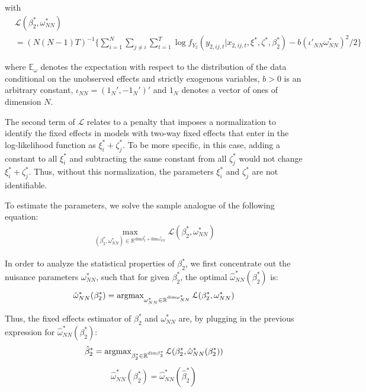 \noindent with 
\begin{align} \label{eq:unconditional}
    &\mathcal{L} (\beta_2^*, \omega_{NN}^*) \\ &= (N(N-1)T)^{-1} \Big\{ \sum_{i=1}^{N}\sum_{j\neq i}\sum_{t=1}^T \log f_{Y_2} ( y_{2,ij,t} \rvert  x_{2,ij,t}, \xi^*, \zeta^*, \beta_2^*) - b(\iota'_{NN} \omega_{NN}^*)^2/2 \Big\} \nonumber
\end{align}

\noindent where $\mathbb{E}_\omega$ denotes the expectation with respect to the distribution of the data conditional on the unobserved effects and strictly exogenous variables, $b>0$ is an arbitrary constant, $\iota_{NN} = (1_N', - 1_N')'$ and $1_N$ denotes a vector of ones of dimension $N$.

The second term of $\mathcal{L}$ relates to a penalty that imposes a normalization to identify the fixed effects in models with two-way fixed effects that enter in the log-likelihood function as $\xi_i^* + \zeta_j^*$. To be more specific, in this case, adding a constant to all $\xi_i^*$ and subtracting the same constant from all $\zeta_j^*$ would not change $\xi_i^* + \zeta_j^*$. Thus, without this normalization, the parameters $\xi_i^*$ and $\zeta_j^*$ are not identifiable.

To estimate the parameters, we solve the sample analogue of the following equation:
\begin{align}
    \max_{(\beta_2^*, \omega_{NN}^*) \in \mathbb{R}^{\text{dim} \beta_2^* + \text{dim} \omega_{NN}^*}} \mathcal{L} (\beta_2^*, \omega_{NN}^*)
    \label{eq:val1}
\end{align}

In order to analyze the statistical properties of $\beta_2^*$, we first concentrate out the nuisance parameters $\omega_{NN}^*$, such that for given $\beta_2^*$, the optimal $\hat{\omega}_{NN}^*(\beta_2^*)$ is:
\begin{align}
 \hat{\omega}_{NN}^*(\beta_2^*) = \operatorname{argmax}_{\omega_{NN}^* \in \mathbb{R}^{\text{dim} \omega_{NN}^*}} \mathcal{L} (\beta_2^*, \omega_{NN}^*)   
\end{align}

Thus, the fixed effects estimator of $\beta_2^*$ and $\omega_{NN}^*$ are, by plugging in the previous expression for $\hat{\omega}_{NN}^*(\beta_2^*)$:
\begin{align} \label{eq:taylor}
   \hat{\beta}_2^* = \operatorname{argmax}_{\beta_2^* \in \mathbb{R}^{\text{dim} \beta_2^*}} \mathcal{L} (\beta_2^*, \hat{\omega}_{NN}^*(\beta_2^*))
\end{align}
\begin{align} \label{eq:omega}
    \hat{\omega}_{NN}^*(\beta_2^*) = \hat{\omega}_{NN}^*(\hat{\beta}_2^*)
\end{align}

